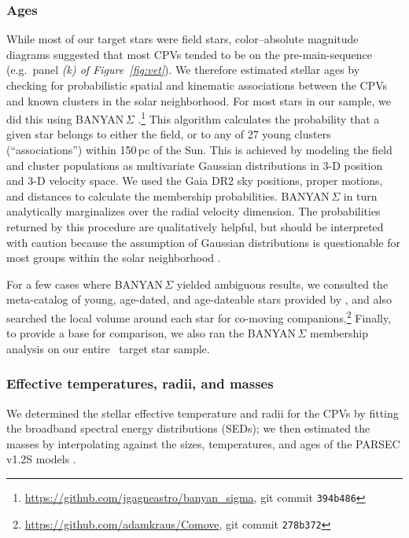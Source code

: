 \documentclass[11pt,twocolumn,tighten,linenumbers]{aastex63}
\begin{document}
\subsubsection{Ages}
While most of our target stars were field stars, color--absolute
magnitude diagrams suggested that most CPVs tended to be on the
pre-main-sequence (e.g.\ panel {\it (k) of Figure~\ref{fig:vet}}).  We
therefore estimated stellar ages by checking for probabilistic spatial
and kinematic associations between the CPVs and known clusters in the
solar neighborhood.  For most stars in our sample, we did this using
BANYAN\,$\Sigma$
\citep{2018ApJ...856...23G}.\footnote{\url{https://github.com/jgagneastro/banyan_sigma},
git commit \texttt{394b486}} This algorithm calculates the probability
that a given star belongs to either the field, or to any of 27 young
clusters (``associations'') within 150\,pc of the Sun.  This is
achieved by modeling the field and cluster populations as multivariate
Gaussian distributions in 3-D position and 3-D velocity space.  We
used the Gaia DR2 sky positions, proper motions, and distances to
calculate the membership probabilities.  BANYAN\,$\Sigma$ in turn
analytically marginalizes over the radial velocity dimension.  The
probabilities returned by this procedure are qualitatively helpful,
but should be interpreted with caution because the assumption of
Gaussian distributions is questionable for most groups within the
solar neighborhood \citep[see e.g.][Figure~10]{2021ApJ...917...23K}.

For a few cases where BANYAN\,$\Sigma$ yielded ambiguous results, we
consulted the meta-catalog of young, age-dated, and age-dateable stars
provided by \citet{2022AJ....163..121B}, and also searched the local
volume around each star for co-moving
companions.\footnote{\url{https://github.com/adamkraus/Comove}, git
commit \texttt{278b372}} Finally, to provide a base for comparison, we
also ran the BANYAN\,$\Sigma$ membership analysis on our entire
\nstarssearched\ target star sample.

\subsubsection{Effective temperatures, radii, and masses}

We determined the stellar effective temperature and radii for the CPVs
by fitting the broadband spectral energy distributions (SEDs); we then
estimated the masses by interpolating against the sizes, temperatures,
and ages of the PARSEC v1.2S models
\citep{2012MNRAS.427..127B,2014MNRAS.444.2525C}.
\end{document}
